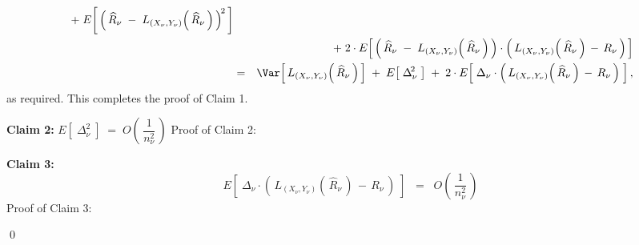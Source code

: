 \begin{enumerate}
\begin{eqnarray*}
        \; + \;
        E\!\left[\,\left(\,
            \widehat{R}_{\nu}
            \;-\;
            L_{(X_{\nu},Y_{\nu})}\!\left(\,\widehat{R}_{\nu}\,\right)
            \,\right)^{\!2}\,\right]
    \\
    &&
        + \;
        2 \cdot
        E\!\left[\,
            \left(\,
                \widehat{R}_{\nu}
                \;-\;
                L_{(X_{\nu},Y_{\nu})}\!\left(\,\widehat{R}_{\nu}\,\right)
                \,\right)
            \cdot
            \left(\,
                L_{(X_{\nu},Y_{\nu})}\!\left(\,\widehat{R}_{\nu}\,\right)
                \,-\,
                R_{\nu}
                \,\right)
            \,\right]
    \\
    & = &
        \Var\!\left[\,
            L_{(X_{\nu},Y_{\nu})}\!\left(\,\widehat{R}_{\nu}\,\right)
            \,\right]
        \; + \;
        E\!\left[\;\Delta_{\nu}^{\!2}\;\right]
        \; + \;
        2 \cdot
        E\!\left[\;
            \Delta_{\nu}
            \cdot
            \left(\,
                L_{(X_{\nu},Y_{\nu})}\!\left(\,\widehat{R}_{\nu}\,\right)
                \,-\,
                R_{\nu}
                \,\right)
            \;\right],
    \end{eqnarray*}
    as required.
    This completes the proof of Claim 1.

    \vskip 0.3cm
    \noindent
    \textbf{Claim 2:}\quad
    $
    E\!\left[\;\Delta_{\nu}^{\!2}\;\right]
    \; = \;
        O\!\left(\,\dfrac{1}{n_{\nu}^{2}}\,\right)
    $
    \vskip 0.1cm
    \noindent
    Proof of Claim 2:\;\;


    \vskip 0.3cm
    \noindent
    \textbf{Claim 3:}\quad
    \begin{equation*}
    E\!\left[\;
        \Delta_{\nu}
        \cdot
        \left(\,
            L_{(X_{\nu},Y_{\nu})}\!\left(\,\widehat{R}_{\nu}\,\right)
            \,-\,
            R_{\nu}
            \,\right)
        \;\right]
    \;\; = \;\;
        O\!\left(\,\dfrac{1}{n_{\nu}^{2}}\,\right)
    \end{equation*}
    \vskip 0.1cm
    \noindent
    Proof of Claim 3:\;\;


\end{enumerate}
\qed

